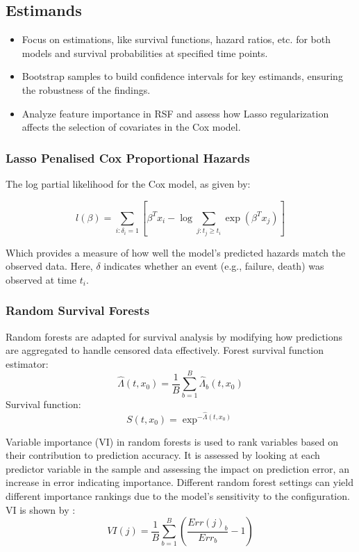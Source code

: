 \subsection{Estimands}
\begin{itemize}
\item Focus on estimations, like survival functions, hazard ratios, etc. for both models and survival probabilities at specified time points.
\item Bootstrap samples to build confidence intervals for key estimands, ensuring the robustness of the findings.
\item Analyze feature importance in RSF and assess how Lasso regularization affects the selection of covariates in the Cox model.
\end{itemize}

\subsubsection{Lasso Penalised Cox Proportional Hazards}
The log partial likelihood for the Cox model, as given by:

\begin{equation} \label{eq:likelihood}l(\beta) = \sum_{i:\delta_{i}=1} \left[ \beta^{T}x_{i} - \log{\sum_{j:t_{j}\ge t_{i}} \exp(\beta^{T}x_{j})} \right]\end{equation}

\noindent Which provides a measure of how well the model's predicted hazards match the observed data. Here, \(\delta\) indicates whether an event (e.g., failure, death) was observed at time \(t_{i}\). 

\subsubsection{Random Survival Forests}
Random forests are adapted for survival analysis by modifying how predictions are aggregated to handle censored data effectively. Forest survival function estimator:
\begin{equation} \label{eq:rsfestimator}\hat{\Lambda}(t, x_{0}) = \frac{1}{B} \sum_{b=1}^{B} \hat{\Lambda}_{b}(t,x_{0})\end{equation}
Survival function:
\begin{equation} \label{eq:survrsf}S(t,x_{0}) = \exp^{-\hat{\Lambda}(t,x_{0})}\end{equation}

\noindent Variable importance (VI) \parencite{pham_springer_2023} in random forests is used to rank variables based on their contribution to prediction accuracy. It is assessed by looking at each predictor variable in the sample and assessing the impact on prediction error, an increase in error indicating importance. Different random forest settings can yield different importance rankings due to the model's sensitivity to the configuration. VI is shown by \parencite{pham_springer_2023}:
\begin{equation} \label{eq:vinorm}
VI(j) = \frac{1}{B}\sum_{b=1}^{B}(\frac{Err(j)_{b}}{Err_{b}}-1)
\end{equation}

